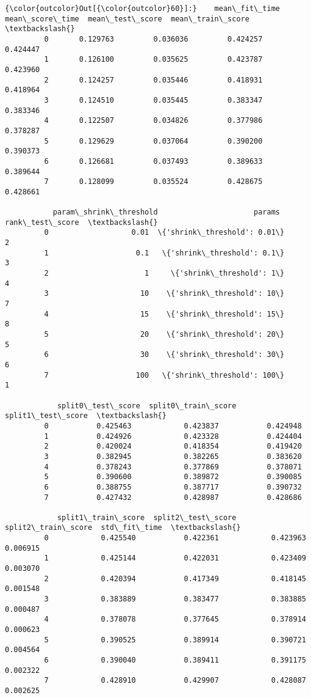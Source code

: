 \documentclass[11pt]{article}
\begin{document}
            \begin{Verbatim}[commandchars=\\\{\}]
{\color{outcolor}Out[{\color{outcolor}60}]:}    mean\_fit\_time  mean\_score\_time  mean\_test\_score  mean\_train\_score  \textbackslash{}
         0       0.129763         0.036036         0.424257          0.424447   
         1       0.126100         0.035625         0.423787          0.423960   
         2       0.124257         0.035446         0.418931          0.418964   
         3       0.124510         0.035445         0.383347          0.383346   
         4       0.122507         0.034826         0.377986          0.378287   
         5       0.129629         0.037064         0.390200          0.390373   
         6       0.126681         0.037493         0.389633          0.389644   
         7       0.128099         0.035524         0.428675          0.428661   
         
           param\_shrink\_threshold                      params  rank\_test\_score  \textbackslash{}
         0                   0.01  \{'shrink\_threshold': 0.01\}                2   
         1                    0.1   \{'shrink\_threshold': 0.1\}                3   
         2                      1     \{'shrink\_threshold': 1\}                4   
         3                     10    \{'shrink\_threshold': 10\}                7   
         4                     15    \{'shrink\_threshold': 15\}                8   
         5                     20    \{'shrink\_threshold': 20\}                5   
         6                     30    \{'shrink\_threshold': 30\}                6   
         7                    100   \{'shrink\_threshold': 100\}                1   
         
            split0\_test\_score  split0\_train\_score  split1\_test\_score  \textbackslash{}
         0           0.425463            0.423837           0.424948   
         1           0.424926            0.423328           0.424404   
         2           0.420024            0.418354           0.419420   
         3           0.382945            0.382265           0.383620   
         4           0.378243            0.377869           0.378071   
         5           0.390600            0.389872           0.390085   
         6           0.388755            0.387717           0.390732   
         7           0.427432            0.428987           0.428686   
         
            split1\_train\_score  split2\_test\_score  split2\_train\_score  std\_fit\_time  \textbackslash{}
         0            0.425540           0.422361            0.423963      0.006915   
         1            0.425144           0.422031            0.423409      0.003070   
         2            0.420394           0.417349            0.418145      0.001548   
         3            0.383889           0.383477            0.383885      0.000487   
         4            0.378078           0.377645            0.378914      0.000623   
         5            0.390525           0.389914            0.390721      0.004564   
         6            0.390040           0.389411            0.391175      0.002322   
         7            0.428910           0.429907            0.428087      0.002625   
         

\end{Verbatim}
\end{document}
